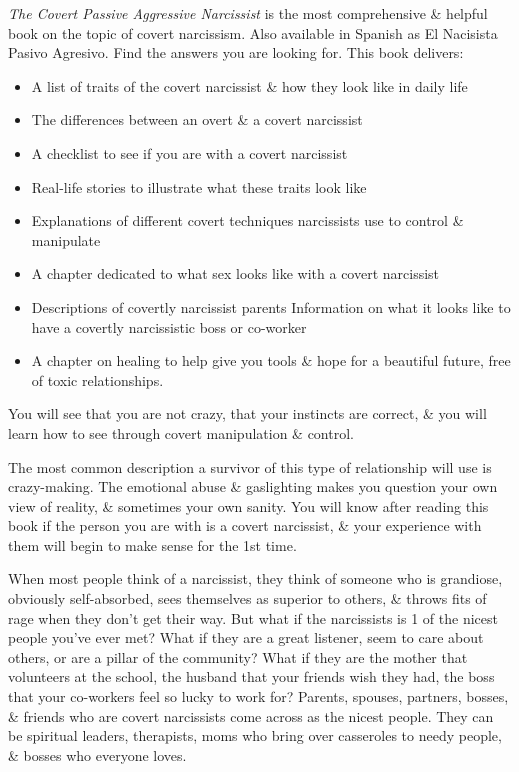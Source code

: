 \documentclass{article}
\begin{document}
\begin{enumerate}
	{\it The Covert Passive Aggressive Narcissist} is the most comprehensive \& helpful book on the topic of covert narcissism. Also available in Spanish as El Nacisista Pasivo Agresivo. Find the answers you are looking for. This book delivers:
	\begin{itemize}
		\item A list of traits of the covert narcissist \& how they look like in daily life
		\item The differences between an overt \& a covert narcissist
		\item A checklist to see if you are with a covert narcissist
		\item Real-life stories to illustrate what these traits look like
		\item Explanations of different covert techniques narcissists use to control \& manipulate
		\item A chapter dedicated to what sex looks like with a covert narcissist
		\item Descriptions of covertly narcissist parents Information on what it looks like to have a covertly narcissistic boss or co-worker
		\item A chapter on healing to help give you tools \& hope for a beautiful future, free of toxic relationships.
	\end{itemize}
	You will see that you are not crazy, that your instincts are correct, \& you will learn how to see through covert manipulation \& control.
	
	The most common description a survivor of this type of relationship will use is crazy-making. The emotional abuse \& gaslighting makes you question your own view of reality, \& sometimes your own sanity. You will know after reading this book if the person you are with is a covert narcissist, \& your experience with them will begin to make sense for the 1st time.
	
	When most people think of a narcissist, they think of someone who is grandiose, obviously self-absorbed, sees themselves as superior to others, \& throws fits of rage when they don't get their way. But what if the narcissists is 1 of the nicest people you've ever met? What if they are a great listener, seem to care about others, or are a pillar of the community? What if they are the mother that volunteers at the school, the husband that your friends wish they had, the boss that your co-workers feel so lucky to work for? Parents, spouses, partners, bosses, \& friends who are covert narcissists come across as the nicest people. They can be spiritual leaders, therapists, moms who bring over casseroles to needy people, \& bosses who everyone loves.
	

\end{enumerate}
\end{document}
